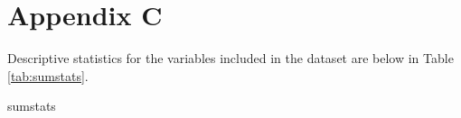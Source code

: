 \documentclass[class=article, crop=false]{standalone}
\begin{document}
\section{Appendix C}
\label{sec:appendixC}
Descriptive statistics for the variables included in the dataset are below in Table \ref{tab:sumstats}.

{sumstats}

\ifstandalone

\fi
\end{document}
